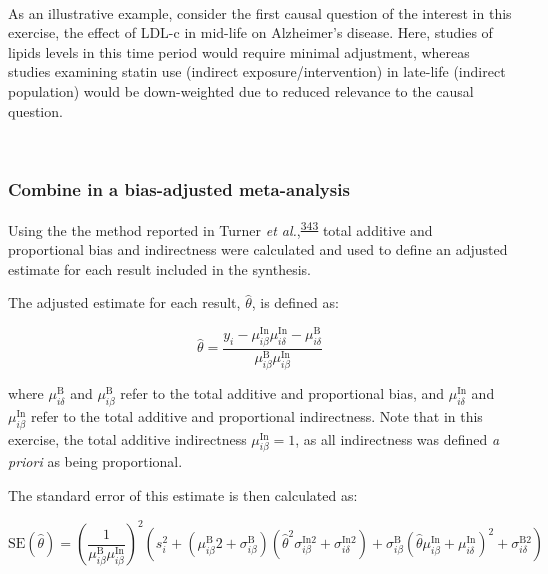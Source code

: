 \documentclass[a4paper, twoside]{templates/ociamthesis}
\begin{document}
~

As an illustrative example, consider the first causal question of the interest in this exercise, the effect of LDL-c in mid-life on Alzheimer's disease. Here, studies of lipids levels in this time period would require minimal adjustment, whereas studies examining statin use (indirect exposure/intervention) in late-life (indirect population) would be down-weighted due to reduced relevance to the causal question.

~

\hypertarget{combine-in-a-bias-adjusted-meta-analysis}{%
\subsubsection{Combine in a bias-adjusted meta-analysis}\label{combine-in-a-bias-adjusted-meta-analysis}}

Using the the method reported in Turner \emph{et al.},\textsuperscript{\protect\hyperlink{ref-turner2009}{343}} total additive and proportional bias and indirectness were calculated and used to define an adjusted estimate for each result included in the synthesis.

The adjusted estimate for each result, \(\hat\theta\), is defined as:

\begin{equation}
  \hat{\theta} = \frac{y_i - \mu_{i\beta}^{\mathrm{In}}\mu_{i\delta}^{\mathrm{In}} - \mu_{i\delta}^{\mathrm{B}}}{\mu_{i\beta}^{\mathrm{B}}\mu_{i\beta}^{\mathrm{In}}}
  \label{eq:adjusted-mean}
\end{equation}

where \(\mu_{i\delta}^{\mathrm{B}}\) and \(\mu_{i\beta}^{\mathrm{B}}\) refer to the total additive and proportional bias, and \(\mu_{i\delta}^{\mathrm{In}}\) and \(\mu_{i\beta}^{\mathrm{In}}\) refer to the total additive and proportional indirectness. Note that in this exercise, the total additive indirectness \(\mu_{i\beta}^{\mathrm{In}} = 1\), as all indirectness was defined \emph{a priori} as being proportional.

The standard error of this estimate is then calculated as:

\begin{equation}
  \mathrm{SE}(\hat{\theta})=\left(\frac{1}{\mu_{i \beta}^{\mathrm{B}} \mu_{i \beta}^{\mathrm{In}}}\right)^{2}\left(s_{i}^{2}+\left(\mu_{i \beta}^{\mathrm{B}} 2+\sigma_{i \beta}^{\mathrm{B}}\right)\left(\hat{\theta}^{2} \sigma_{i \beta}^{\mathrm{In} 2}+\sigma_{i \delta}^{\mathrm{In} 2}\right)+\sigma_{i \beta}^{\mathrm{B}}\left(\hat{\theta} \mu_{i \beta}^{\mathrm{In}}+\mu_{i \delta}^{\mathrm{In}}\right)^{2}+\sigma_{i \delta}^{\mathrm{B} 2}\right)
  \label{eq:adjusted-se}
\end{equation}
\end{document}
